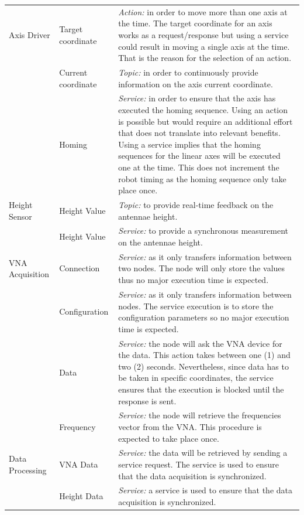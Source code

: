 \documentclass{article}
\begin{document}
\begin{singlespace}
\begin{longtable}{|l|l|p{10cm}|}
        Axis Driver & Target coordinate & \textit{Action:} in order to move more than one axis at the time. The target coordinate for an axis works as a request/response but using a service could result in moving a single axis at the time. That is the reason for the selection of an action. \\ \cline{2-3}
        & Current coordinate & \textit{Topic:} in order to continuously provide information on the axis current coordinate. \\ \cline{2-3}
        & Homing & \textit{Service:} in order to ensure that the axis has executed the homing sequence. Using an action is possible but would require an additional effort that does not translate into relevant benefits. Using a service implies that the homing sequences for the linear axes will be executed one at the time. This does not increment the robot timing as the homing sequence only take place once. \\ \hline
        Height Sensor & Height Value & \textit{Topic:} to provide real-time feedback on the antennae height. \\ \cline{2-3}
        & Height Value & \textit{Service:} to provide a synchronous measurement on the antennae height. \\ \hline
        VNA Acquisition & Connection & \textit{Service:} as it only transfers information between two nodes. The node will only store the values thus no major execution time is expected. \\ \cline{2-3}
        & Configuration & \textit{Service:} as it only transfers information between nodes. The service execution is to store the configuration parameters so no major execution time is expected. \\ \cline{2-3}
        & Data & \textit{Service:} the node will ask the VNA device for the data. This action takes between one (1) and two (2) seconds. Nevertheless, since data has to be taken in specific coordinates, the service ensures that the execution is blocked until the response is sent. \\ \cline{2-3}
        & Frequency & \textit{Service:} the node will retrieve the frequencies vector from the VNA. This procedure is expected to take place once. \\ \hline
        Data Processing & VNA Data & \textit{Service:} the data will be retrieved by sending a service request. The service is used to ensure that the data acquisition is synchronized. \\ \cline{2-3}
        & Height Data & \textit{Service:} a service is used to ensure that the data acquisition is synchronized. \\ \hline

\end{longtable}
\end{singlespace}
\end{document}
